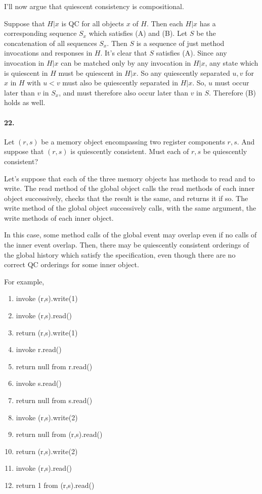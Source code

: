 \documentclass[
]{article}
\begin{document}
I'll now argue that quiescent consistency is compositional.

Suppose that $H|x$ is QC for all objects $x$ of $H$.  Then each $H|x$ has a corresponding sequence $S_x$ which satisfies (A) and (B).  Let $S$ be the concatenation of all sequences $S_x$. Then $S$ is a sequence of just method invocations and responses in $H$.  It's clear that $S$ satisfies (A).  Since any invocation in $H|x$ can be matched only by any invocation in $H|x$, any state which is quiescent in $H$ must be quiescent in $H|x$.  So any quiescently separated $u,v$ for $x$ in $H$ with $u<v$ must also be quiescently separated in $H|x$. So, $u$ must occur later than $v$ in $S_x$, and must therefore also occur later than $v$ in $S$.  Therefore (B) holds as well.

\paragraph{22.} Let $(r, s)$ be a memory object encompassing two register components $r, s$.  And suppose that $(r,s)$ is quiescently consistent.  Must each of $r, s$ be quiescently consistent?

Let's suppose that each of the three memory objects has methods to read and to write.  The read method of the global object calls the read methods of each inner object successively, checks that the result is the same, and returns it if so.  The write method of the global object successively calls, with the same argument, the write methods of each inner object.  

In this case, some method calls of the global event may overlap even if no calls of the inner event overlap.  Then, there may be quiescently consistent orderings of the global history which satisfy the specification, even though there are no correct QC orderings for some inner object.

For example,
\begin{enumerate}
\item invoke (r,s).write(1)
\item invoke (r,s).read()
\item return (r,s).write(1)
\item invoke r.read()
\item return null from r.read()
\item invoke s.read()
\item return null from s.read()
\item invoke (r,s).write(2)
\item return null from (r,s).read()
\item return (r,s).write(2)
\item invoke (r,s).read()
\item return 1 from (r,s).read()
\end{enumerate}
\end{document}
